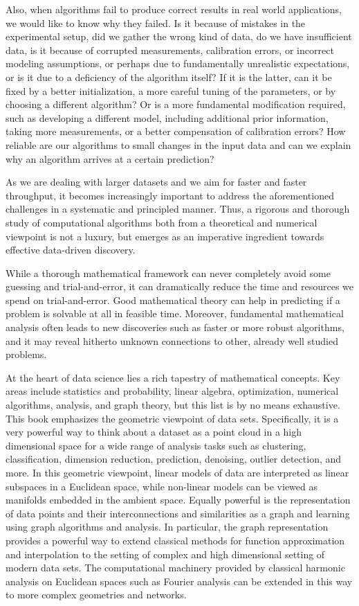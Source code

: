 Also, when algorithms fail to produce correct results in real world applications, we would like to know why they failed. Is it because of %
 mistakes in the experimental setup, did we gather the wrong kind of data, do we have insufficient data, is it because of corrupted measurements, calibration errors, or  incorrect modeling assumptions, or perhaps due to fundamentally unrealistic expectations, or is it due to a deficiency of the algorithm itself? If it is the latter, can it be fixed by a better initialization, a more careful tuning of the parameters, or by choosing a different algorithm? Or is a more fundamental modification required, such as developing a different model, including additional prior information, taking more measurements, or a better compensation of calibration errors? How reliable are our  algorithms to small changes in the input data and
can we explain why an algorithm arrives at a certain prediction?

As we are dealing with larger datasets and we aim for faster and faster throughput,  it becomes increasingly important to address the aforementioned challenges in a systematic and principled manner.
Thus, a rigorous and thorough study of computational algorithms both from a theoretical and numerical viewpoint is not a luxury, but  emerges as
an imperative ingredient towards effective data-driven discovery.



While a thorough mathematical framework can never completely avoid some guessing and trial-and-error, it can dramatically reduce  the time and resources we spend on trial-and-error. Good mathematical theory can help in predicting if a problem is solvable at all in feasible time. Moreover, fundamental mathematical analysis often leads to new discoveries such as faster or more robust algorithms, and it may reveal hitherto unknown connections to other, already well studied problems.




At the heart of data science lies a rich tapestry of mathematical concepts. Key areas include statistics and  probability, linear algebra, optimization,  numerical algorithms, analysis, and graph theory,  but this list is by no means exhaustive. This book emphasizes the geometric viewpoint of data sets. Specifically, it is a very powerful way to think about a dataset as a point cloud in a high dimensional space for a wide range of analysis tasks such as clustering, classification, dimension reduction, prediction, denoising, outlier detection, and more. In this geometric viewpoint, linear models of data are interpreted as linear subspaces in a Euclidean space, while non-linear models can be viewed as manifolds embedded in the ambient space. Equally powerful is the representation of data points and their interconnections and similarities as a graph and learning using graph algorithms and analysis. In particular, the graph representation provides a powerful way to extend classical methods for function approximation and interpolation to the setting of complex and high dimensional setting of modern data sets. The computational machinery provided by classical harmonic analysis on Euclidean spaces such as Fourier analysis can be extended in this way to more complex geometries and networks.


